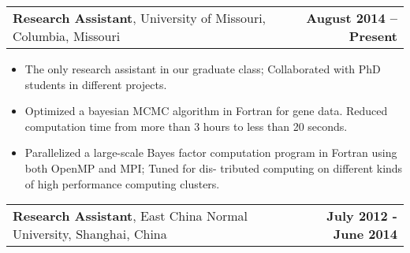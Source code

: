 \documentclass[11pt]{article}
\makeatletter
\newcommand{\headerrow}[2]
{\begin{tabular*}{\linewidth}{l@{\extracolsep{\fill}}r}
	#1 & #2 \\
\end{tabular*}
}
\makeatother
\begin{document}
\headerrow
{\textbf{Research Assistant}, University of Missouri, Columbia, Missouri}
{\textbf{August 2014 – Present}}
\begin{itemize}
	\item The only research assistant in our graduate class; Collaborated with PhD students in different projects.
	\item Optimized a bayesian MCMC algorithm in Fortran for gene data. Reduced computation time from more than 3 hours to less than 20 seconds.
	\item Parallelized a large-scale Bayes factor computation program in Fortran using both OpenMP and MPI; Tuned for dis- tributed computing on different kinds of high performance computing clusters.
\end{itemize}

\noindent\headerrow
{\textbf{Research Assistant}, East China Normal University, Shanghai, China}
{\textbf{July 2012 - June 2014}}
\end{document}
